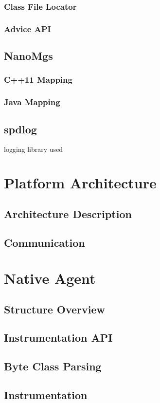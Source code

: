 \documentclass[12pt,a4paper]{report}
\begin{document}
\subsection{Class File Locator}
\subsection{Advice API}
\section{NanoMgs}
\subsection{C++11 Mapping}
\subsection{Java Mapping}

\section{spdlog}
logging library used
\chapter{Platform Architecture}
\section{Architecture Description}
\section{Communication}

\chapter{Native Agent}
\section{Structure Overview}
\section{Instrumentation API}
\section{Byte Class Parsing}
\section{Instrumentation}
\end{document}
